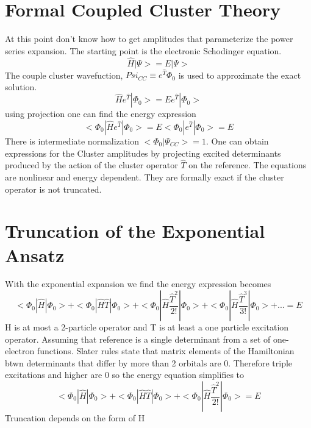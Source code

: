 \documentclass[10pt, draft]{article}
\begin{document}

\section*{Formal Coupled Cluster Theory}
At this point don't know how to get amplitudes that parameterize the power series expansion.  The starting point is the electronic Schodinger equation.
\[ \hat{H}|\Psi> = E|\Psi> \] 
The couple cluster wavefuction, $Psi_{CC} \equiv e^{\hat{T}} \Phi_0$ is used to approximate the exact solution.
\[\hat{H}e^{\hat{T}}|\Phi_0> = Ee^{\hat{T}}|\Phi_0> \]
using projection one can find the energy expression 
\[<\Phi_0|\hat{H}e^{\hat{T}}|\Phi_0> = E<\Phi_0|e^{\hat{T}}|\Phi_0> = E\]
There is intermediate normalization $<\Phi_0|\Psi_{CC}> = 1.$  One can obtain expressions for the Cluster amplitudes by projecting excited determinants produced by the action of the cluster operator $\hat{T}$ on the reference.  The equations are nonlinear and energy dependent.  They are formally exact if the cluster operator is not truncated.  

\section{Truncation of the Exponential Ansatz}
With the exponential expansion we find the energy expression becomes 
\[ <\Phi_0| \hat{H} |\Phi_0> + <\Phi_0| \hat{H} \hat{T}|\Phi_0> + <\Phi_0| \hat{H} \frac{\hat{T}^2}{2!} |\Phi_0> +  <\Phi_0| \hat{H} \frac{\hat{T}^3}{3!} |\Phi_0> + ... = E \]
H is at most a 2-particle operator and T is at least a one particle excitation operator. Assuming that reference is a single determinant from a set of one-electron functions. Slater rules state that matrix elements of the Hamiltonian btwn determinants that differ by more than 2 orbitals are 0.  Therefore triple excitations and higher are 0 so the energy equation simplifies to 
\[ <\Phi_0| \hat{H} |\Phi_0> + <\Phi_0| \hat{H} \hat{T}|\Phi_0> + <\Phi_0| \hat{H} \frac{\hat{T}^2}{2!} |\Phi_0> = E\]
Truncation depends on the form of H
\end{document}
